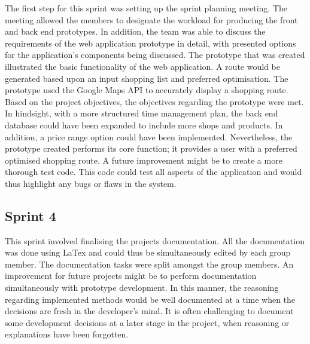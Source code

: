 \documentclass[10pt, a4paper, onecolumn]{scrartcl}
\begin{document}
			The first step for this sprint was setting up the sprint planning meeting. The meeting allowed the members to designate the workload for producing the front and back end prototypes. In addition, the team was able to discuss the requirements of the web application prototype in detail, with presented options for the application's components being discussed. The prototype that was created illustrated the basic functionality of the web application. A route would be generated based upon an input shopping list and preferred optimisation.  The prototype used the Google Maps API to accurately display a shopping route. Based on the project objectives, the objectives regarding the prototype were met. In hindsight, with a more structured time management plan, the back end database could have been expanded to include more shops and products. In addition, a price range option could have been implemented. Nevertheless, the prototype created performs its core function; it provides a user with a preferred optimised shopping route. A future improvement might be to create a more thorough test code. This code could test all aspects of the application and would thus highlight any bugs or flaws in the system. 
		
		\subsection{Sprint 4}	
				
			This sprint involved finalising the projects documentation. All the documentation was done using LaTex and could thus be simultaneously edited by each group member. The documentation tasks were split amongst the group members. An improvement for future projects might be to perform documentation simultaneously with prototype development. In this manner, the reasoning regarding implemented methods would be well documented at a time when the decisions are fresh in the developer's mind. It is often challenging to document some development decisions at a later stage in the project, when reasoning or explanations have been forgotten. 
				

				
			
			
	
	
\end{document}
